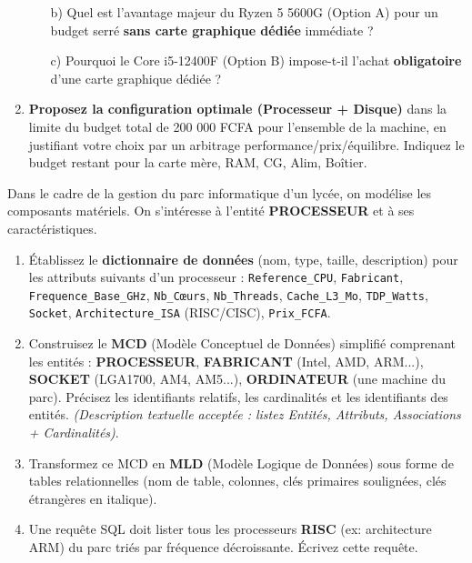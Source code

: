 \documentclass[11pt]{article}
\begin{document}
\begin{exercice}
\begin{enumerate}
\begin{itemize}
        \item[b)] Quel est l'avantage majeur du Ryzen 5 5600G (Option A) pour un budget serré \textbf{sans carte graphique dédiée} immédiate ?
        \item[c)] Pourquoi le Core i5-12400F (Option B) impose-t-il l'achat \textbf{obligatoire} d'une carte graphique dédiée ?
    \end{itemize}
    \item \textbf{Proposez la configuration optimale (Processeur + Disque)} dans la limite du budget total de 200 000 FCFA pour l'ensemble de la machine, en justifiant votre choix par un arbitrage performance/prix/équilibre. Indiquez le budget restant pour la carte mère, RAM, CG, Alim, Boîtier.
\end{enumerate}
\end{exercice}

\begin{exercice}
Dans le cadre de la gestion du parc informatique d'un lycée, on modélise les composants matériels. On s'intéresse à l'entité \textbf{PROCESSEUR} et à ses caractéristiques.
\begin{enumerate}
    \item Établissez le \textbf{dictionnaire de données} (nom, type, taille, description) pour les attributs suivants d'un processeur : \texttt{Reference\_CPU}, \texttt{Fabricant}, \texttt{Frequence\_Base\_GHz}, \texttt{Nb\_Cœurs}, \texttt{Nb\_Threads}, \texttt{Cache\_L3\_Mo}, \texttt{TDP\_Watts}, \texttt{Socket}, \texttt{Architecture\_ISA} (RISC/CISC), \texttt{Prix\_FCFA}.
    \item Construisez le \textbf{MCD} (Modèle Conceptuel de Données) simplifié comprenant les entités : \textbf{PROCESSEUR}, \textbf{FABRICANT} (Intel, AMD, ARM...), \textbf{SOCKET} (LGA1700, AM4, AM5...), \textbf{ORDINATEUR} (une machine du parc). Précisez les identifiants relatifs, les cardinalités et les identifiants des entités. \textit{(Description textuelle acceptée : listez Entités, Attributs, Associations + Cardinalités)}.
    \item Transformez ce MCD en \textbf{MLD} (Modèle Logique de Données) sous forme de tables relationnelles (nom de table, colonnes, clés primaires soulignées, clés étrangères en italique).
    \item Une requête SQL doit lister tous les processeurs \textbf{RISC} (ex: architecture ARM) du parc triés par fréquence décroissante. Écrivez cette requête.
\end{enumerate}
\end{exercice}
\end{document}
